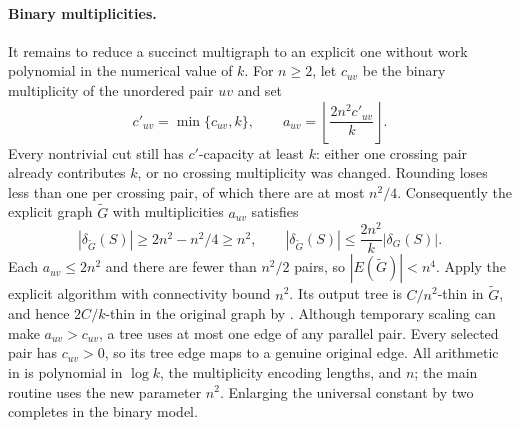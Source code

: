 \paragraph{Binary multiplicities.}
It remains to reduce a succinct multigraph to an explicit one without
work polynomial in the numerical value of $k$. For $n\ge2$, let
$c_{uv}$ be the binary multiplicity of the unordered pair $uv$ and set
\begin{equation}
 c'_{uv}=\min\{c_{uv},k\},\qquad
 a_{uv}=\left\lfloor\frac{2n^2c'_{uv}}k\right\rfloor.
 \label{eq:ta-binary-reduction}
\end{equation}
Every nontrivial cut still has $c'$-capacity at least $k$: either one
crossing pair already contributes $k$, or no crossing multiplicity was
changed. Rounding loses less than one per crossing pair, of which
there are at most $n^2/4$. Consequently the explicit graph $\widetilde G$
with multiplicities $a_{uv}$ satisfies
\begin{equation}
 |\delta_{\widetilde G}(S)|\ge2n^2-n^2/4\ge n^2,
 \qquad
 |\delta_{\widetilde G}(S)|\le\frac{2n^2}k|\delta_G(S)|.
 \label{eq:ta-binary-cuts}
\end{equation}
Each $a_{uv}\le2n^2$ and there are fewer than $n^2/2$ pairs, so
$|E(\widetilde G)|<n^4$.
Apply the explicit algorithm with connectivity bound $n^2$.
Its output tree is $C/n^2$-thin in $\widetilde G$, and hence
$2C/k$-thin in the original graph by .
Although temporary scaling can make $a_{uv}>c_{uv}$, a tree uses at
most one edge of any parallel pair. Every selected pair has
$c_{uv}>0$, so its tree edge maps to a genuine original edge.
All arithmetic in  is polynomial in
$\log k$, the multiplicity encoding lengths, and $n$; the main routine
uses the new parameter $n^2$. Enlarging the universal constant by two
completes  in the binary model.
